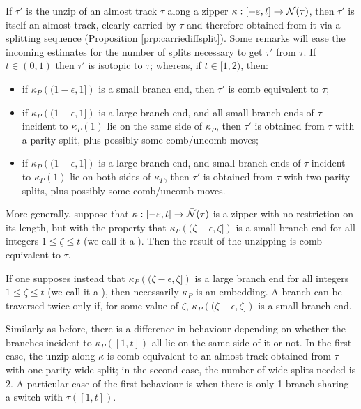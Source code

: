 \begin{rmk}\label{rmk:zipvssplit}
If $\tau'$ is the unzip of an almost track $\tau$ along a zipper $\kappa:[-\varepsilon,t]\rightarrow \bar{{\mathcal N}}(\tau)$, then $\tau'$ is itself an almost track, clearly carried by $\tau$ and therefore obtained from it via a splitting sequence (Proposition \ref{prp:carriediffsplit}). Some remarks will ease the incoming estimates for the number of splits necessary to get $\tau'$ from $\tau$. If $t\in (0,1)$ then $\tau'$ is isotopic to $\tau$; whereas, if $t\in[1,2)$, then:
\begin{itemize}
\item if $\kappa_P\left((1-\epsilon,1]\right)$ is a small branch end, then $\tau'$ is comb equivalent to $\tau$;
\item if $\kappa_P\left((1-\epsilon,1]\right)$ is a large branch end, and all small branch ends of $\tau$ incident to $\kappa_P(1)$ lie on the same side of $\kappa_P$, then $\tau'$ is obtained from $\tau$ with a parity split, plus possibly some comb/uncomb moves;
\item if $\kappa_P\left((1-\epsilon,1]\right)$ is a large branch end, and small branch ends of $\tau$ incident to $\kappa_P(1)$ lie on both sides of $\kappa_P$, then $\tau'$ is obtained from $\tau$ with two parity splits, plus possibly some comb/uncomb moves.
\end{itemize}

More generally, suppose that $\kappa:[-\varepsilon,t]\rightarrow \bar{{\mathcal N}}(\tau)$ is a zipper with no restriction on its length, but with the property that $\kappa_P\left((\zeta-\epsilon,\zeta]\right)$ is a small branch end for all integers $1\leq \zeta\leq t$ (we call it a ). Then the result of the unzipping is comb equivalent to $\tau$.

If one supposes instead that $\kappa_P\left((\zeta-\epsilon,\zeta]\right)$ is a large branch end for all integers $1\leq \zeta\leq t$ (we call it a ), then necessarily $\kappa_P$ is an embedding. A branch can be traversed twice only if, for some value of $\zeta$, $\kappa_P\left((\zeta-\epsilon,\zeta]\right)$ is a small branch end.

Similarly as before, there is a difference in behaviour depending on whether the branches incident to $\kappa_P([1,t])$ all lie on the same side of it or not. In the first case, the unzip along $\kappa$ is comb equivalent to an almost track obtained from $\tau$ with one parity wide split; in the second case, the number of wide splits needed is $2$. A particular case of the first behaviour is when there is only 1 branch sharing a switch with $\tau([1,t])$.


\end{rmk}
